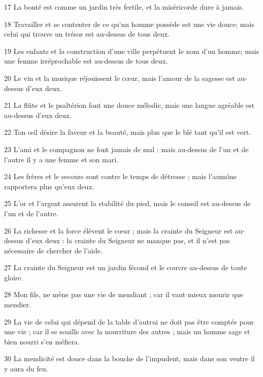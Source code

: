 \par 17 La bonté est comme un jardin très fertile, et la miséricorde dure à jamais.
\par 18 Travailler et se contenter de ce qu'un homme possède est une vie douce; mais celui qui trouve un trésor est au-dessus de tous deux.
\par 19 Les enfants et la construction d'une ville perpétuent le nom d'un homme; mais une femme irréprochable est au-dessus de tous deux.
\par 20 Le vin et la musique réjouissent le cœur, mais l'amour de la sagesse est au-dessus d'eux deux.
\par 21 La flûte et le psaltérion font une douce mélodie, mais une langue agréable est au-dessus d'eux deux.
\par 22 Ton œil désire la faveur et la beauté, mais plus que le blé tant qu'il est vert.
\par 23 L'ami et le compagnon ne font jamais de mal : mais au-dessus de l'un et de l'autre il y a une femme et son mari.
\par 24 Les frères et le secours sont contre le temps de détresse ; mais l'aumône rapportera plus qu'eux deux.
\par 25 L'or et l'argent assurent la stabilité du pied, mais le conseil est au-dessus de l'un et de l'autre.
\par 26 La richesse et la force élèvent le cœur ; mais la crainte du Seigneur est au-dessus d'eux deux : la crainte du Seigneur ne manque pas, et il n'est pas nécessaire de chercher de l'aide.
\par 27 La crainte du Seigneur est un jardin fécond et le couvre au-dessus de toute gloire.
\par 28 Mon fils, ne mène pas une vie de mendiant ; car il vaut mieux mourir que mendier.
\par 29 La vie de celui qui dépend de la table d'autrui ne doit pas être comptée pour une vie ; car il se souille avec la nourriture des autres ; mais un homme sage et bien nourri s'en méfiera.
\par 30 La mendicité est douce dans la bouche de l'impudent, mais dans son ventre il y aura du feu.


